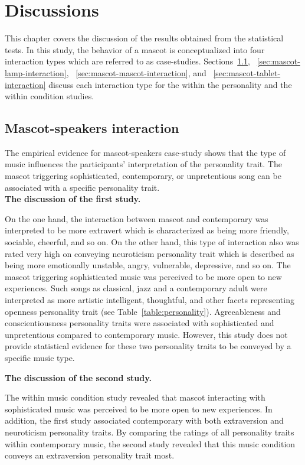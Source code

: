 \chapter{Discussions}
\label{ch:discussions}
This chapter covers the discussion of the results obtained from the statistical tests.
In this study, the behavior of a mascot is conceptualized into four interaction types which are referred to as case-studies.
Sections~\ref{sec:mascot-speakers-interaction}, ~\ref{sec:mascot-lamp-interaction},
~\ref{sec:mascot-mascot-interaction}, and ~\ref{sec:mascot-tablet-interaction} discuss each interaction type for the
within the personality and the within condition studies.

\section{Mascot-speakers interaction}
\label{sec:mascot-speakers-interaction}
The empirical evidence for mascot-speakers case-study shows that the type of music influences the participants'
interpretation of the personality trait.
The mascot triggering sophisticated, contemporary, or unpretentious song can be associated
with a specific personality trait. \\

\textbf{The discussion of the first study.}\par
On the one hand, the interaction between mascot and contemporary was interpreted
to be more extravert which is characterized as being more friendly,
sociable, cheerful, and so on.
On the other hand, this type of interaction also was rated very high on conveying
neuroticism personality trait which is described as being more emotionally unstable,
angry, vulnerable, depressive, and so on.
The mascot triggering sophisticated music was perceived to be more open to new experiences.
Such songs as classical, jazz and a contemporary adult were interpreted as more artistic intelligent,
thoughtful, and other facets representing openness personality trait (see Table~\ref{table:personality}).
Agreeableness and conscientiousness personality traits were associated with sophisticated and
unpretentious compared to contemporary music.
However, this study does not provide statistical evidence for these two personality traits to be
conveyed by a specific music type.

\textbf{The discussion of the second study.}\par
The within music condition study revealed that mascot interacting with sophisticated music
was perceived to be more open to new experiences.
In addition, the first study associated contemporary with both extraversion and neuroticism personality traits.
By comparing the ratings of all personality traits within contemporary music, the second study revealed that this
music condition conveys an extraversion personality trait most.


